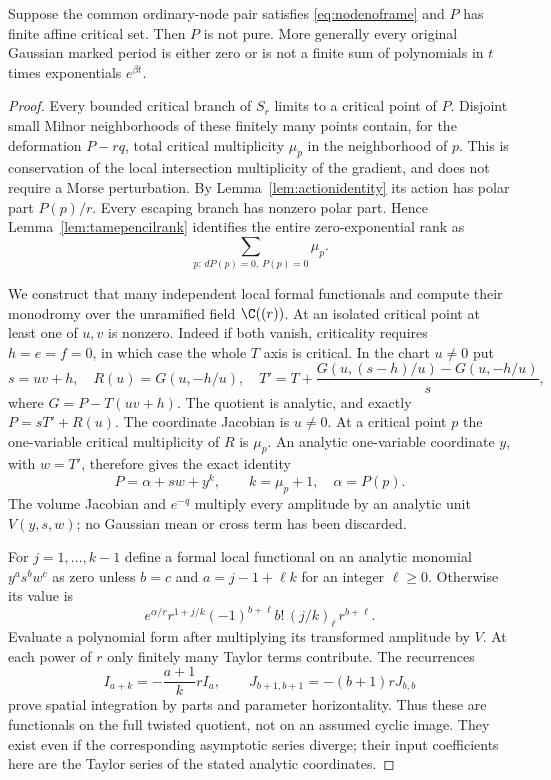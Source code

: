 \begin{proposition}\label{prop:ordinaryfinite}
Suppose the common ordinary-node pair satisfies
\eqref{eq:nodenoframe} and $P$ has finite affine critical set.
Then $P$ is not pure. More generally every original Gaussian
marked period is either zero or is not a finite sum of
polynomials in $t$ times exponentials $e^{\beta t}$.
\end{proposition}
\begin{proof}
Every bounded critical branch of $S_r$ limits to a critical point
of $P$. Disjoint small Milnor neighborhoods of these finitely many
points contain, for the deformation $P-rq$, total critical
multiplicity $\mu_p$ in the neighborhood of $p$. This is
conservation of the local intersection multiplicity of the
gradient, and does not require a Morse perturbation. By
Lemma~\ref{lem:actionidentity} its action has polar part
$P(p)/r$. Every escaping branch has nonzero polar part. Hence
Lemma~\ref{lem:tamepencilrank} identifies the entire zero-exponential
rank as
\begin{equation}\label{eq:ordinaryzerorank}
 \sum_{p:\,dP(p)=0,\,P(p)=0}\mu_p.
\end{equation}

We construct that many independent local formal functionals and
compute their monodromy over the unramified field $\C((r))$.
At an isolated critical point at least one of $u,v$ is nonzero.
Indeed if both vanish, criticality requires $h=e=f=0$, in which
case the whole $T$ axis is critical. In the chart $u\ne0$ put
\[
 s=uv+h,\quad R(u)=G(u,-h/u),\quad
 T'=T+\frac{G(u,(s-h)/u)-G(u,-h/u)}s,
\]
where $G=P-T(uv+h)$. The quotient is analytic, and exactly
$P=sT'+R(u)$. The coordinate Jacobian is $u\ne0$. At a critical
point $p$ the one-variable critical multiplicity of $R$ is
$\mu_p$. An analytic one-variable coordinate $y$, with
$w=T'$, therefore gives the exact identity
\[
 P=\alpha+sw+y^k,\qquad k=\mu_p+1,\quad\alpha=P(p).
\]
The volume Jacobian and $e^{-q}$ multiply every amplitude by an
analytic unit $V(y,s,w)$; no Gaussian mean or cross term has been
discarded.

For $j=1,\ldots,k-1$ define a formal local functional on an
analytic monomial $y^a s^b w^c$ as zero unless $b=c$ and
$a=j-1+\ell k$ for an integer $\ell\ge0$. Otherwise its value is
\begin{equation}\label{eq:ordinarycharacters}
 e^{\alpha/r}r^{1+j/k}
       (-1)^{b+\ell}b!\,(j/k)_\ell\,r^{b+\ell}.
\end{equation}
Evaluate a polynomial form after multiplying its transformed
amplitude by $V$. At each power of $r$ only finitely many Taylor
terms contribute. The recurrences
\[
 I_{a+k}=-\frac{a+1}{k}r I_a,\qquad
 J_{b+1,b+1}=-(b+1)rJ_{b,b}
\]
prove spatial integration by parts and parameter horizontality.
Thus these are functionals on the full twisted quotient, not on
an assumed cyclic image. They exist even if the corresponding
asymptotic series diverge; their input coefficients here are the
Taylor series of the stated analytic coordinates.


\end{proof}
